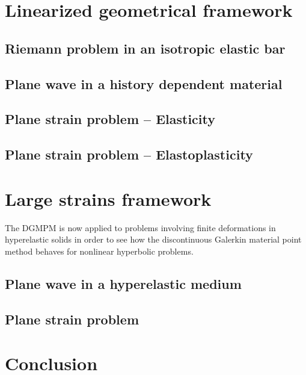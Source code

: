 \section{Linearized geometrical framework}
\label{sec:hpp_simulations}

\subsection{Riemann problem in an isotropic elastic bar}
\label{subsec:hpp_bar}


\subsection{Plane wave in a history dependent material}
\label{subsec:hpp_planewave}


\subsection{Plane strain problem -- Elasticity}
\label{subsec:el_planestrain}


\subsection{Plane strain problem -- Elastoplasticity}
\label{subsec:ep_planestrain}


\section{Large strains framework}
\label{sec:he_simulations}
The DGMPM is now applied to problems involving finite deformations in hyperelastic solids in order to see how the discontinuous Galerkin material point method behaves for nonlinear hyperbolic problems.
\subsection{Plane wave in a hyperelastic medium}
\label{subsec:he_planewave}


\subsection{Plane strain problem}
\label{subsec:he_plate}




\section{Conclusion}
